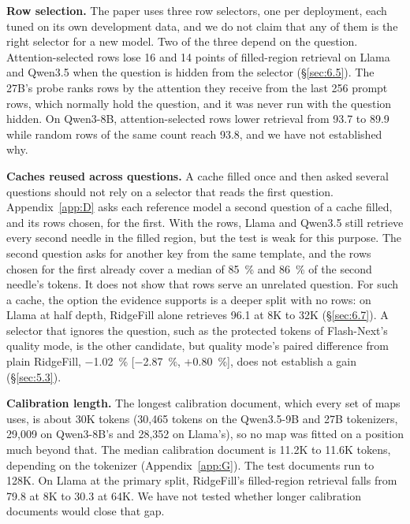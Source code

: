 \documentclass[11pt]{article}
\begin{document}
\textbf{Row selection.} The paper uses three row selectors, one per deployment, each tuned on its own development data, and we do not claim that any of them is the right selector for a new model. Two of the three depend on the question. Attention-selected rows lose 16 and 14 points of filled-region retrieval on Llama and Qwen3.5 when the question is hidden from the selector (\S\ref{sec:6.5}). The 27B's probe ranks rows by the attention they receive from the last 256 prompt rows, which normally hold the question, and it was never run with the question hidden. On Qwen3-8B, attention-selected rows lower retrieval from 93.7 to 89.9 while random rows of the same count reach 93.8, and we have not established why.

\textbf{Caches reused across questions.} A cache filled once and then asked several questions should not rely on a selector that reads the first question. Appendix~\ref{app:D} asks each reference model a second question of a cache filled, and its rows chosen, for the first. With the rows, Llama and Qwen3.5 still retrieve every second needle in the filled region, but the test is weak for this purpose. The second question asks for another key from the same template, and the rows chosen for the first already cover a median of 85~\% and 86~\% of the second needle's tokens. It does not show that rows serve an unrelated question. For such a cache, the option the evidence supports is a deeper split with no rows: on Llama at half depth, RidgeFill alone retrieves 96.1 at 8K to 32K (\S\ref{sec:6.7}). A selector that ignores the question, such as the protected tokens of Flash-Next's quality mode, is the other candidate, but quality mode's paired difference from plain RidgeFill, $-$1.02~\% [$-$2.87~\%, +0.80~\%], does not establish a gain (\S\ref{sec:5.3}).

\textbf{Calibration length.} The longest calibration document, which every set of maps uses, is about 30K tokens (30,465 tokens on the Qwen3.5-9B and 27B tokenizers, 29,009 on Qwen3-8B's and 28,352 on Llama's), so no map was fitted on a position much beyond that. The median calibration document is 11.2K to 11.6K tokens, depending on the tokenizer (Appendix~\ref{app:G}). The test documents run to 128K. On Llama at the primary split, RidgeFill's filled-region retrieval falls from 79.8 at 8K to 30.3 at 64K. We have not tested whether longer calibration documents would close that gap.
\end{document}
